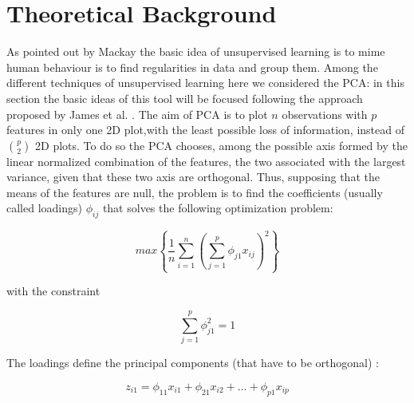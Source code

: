 \documentclass[
12pt, %
a4paper, %
oneside, %
headinclude,footinclude, %
BCOR5mm, %
]{scrartcl}
\begin{document}
\section{Theoretical Background} \label{introduction}
As pointed out by Mackay \cite{mackay2003information} the basic idea of unsupervised learning is to mime human behaviour is to find regularities in data and group them. Among the different techniques of unsupervised learning \cite{james2013introduction} here we considered the PCA: in this section the basic ideas of this tool will be focused following the approach proposed by James et al. \cite{james2013introduction}. The aim of PCA is to plot $n$ observations with $p$ features in only one 2D plot,with the least possible loss of information, instead of $\binom{p}{2}$ 2D plots. To do so the PCA chooses, among the possible axis formed by the linear normalized combination of the features, the two associated with the largest variance, given that these two axis are orthogonal. Thus, supposing that the means of the features are null, the problem is to find the coefficients (usually called loadings) $\phi_{ij}$ that solves the following optimization problem:

\begin{equation}
max\left\lbrace \dfrac{1}{n} \sum_{i=1}^{n} \left(\sum^{p} _{j=1} \phi_{j1}x_{ij} \right)^{2}   \right\rbrace
\end{equation}

with the constraint 

\begin{equation}
\sum_{j=1}^{p}\phi_{j1}^{2}=1
\end{equation}

The loadings define the principal components (that have to be orthogonal) : 

\begin{equation}
z_{i1}=\phi_{11}x_{i1}+\phi_{21}x_{i2}+...+\phi_{p1}x_{ip}
\end{equation}
\end{document}
